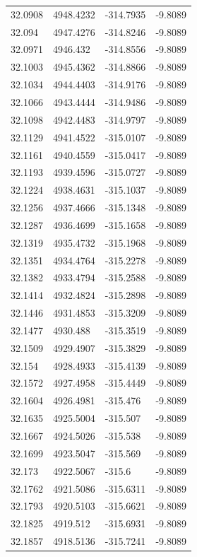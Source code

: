\begin{table}[H]
\begin{tabular}{llll}
32.0908 & 4948.4232 & -314.7935 & -9.8089 \\
32.094 & 4947.4276 & -314.8246 & -9.8089 \\
32.0971 & 4946.432 & -314.8556 & -9.8089 \\
32.1003 & 4945.4362 & -314.8866 & -9.8089 \\
32.1034 & 4944.4403 & -314.9176 & -9.8089 \\
32.1066 & 4943.4444 & -314.9486 & -9.8089 \\
32.1098 & 4942.4483 & -314.9797 & -9.8089 \\
32.1129 & 4941.4522 & -315.0107 & -9.8089 \\
32.1161 & 4940.4559 & -315.0417 & -9.8089 \\
32.1193 & 4939.4596 & -315.0727 & -9.8089 \\
32.1224 & 4938.4631 & -315.1037 & -9.8089 \\
32.1256 & 4937.4666 & -315.1348 & -9.8089 \\
32.1287 & 4936.4699 & -315.1658 & -9.8089 \\
32.1319 & 4935.4732 & -315.1968 & -9.8089 \\
32.1351 & 4934.4764 & -315.2278 & -9.8089 \\
32.1382 & 4933.4794 & -315.2588 & -9.8089 \\
32.1414 & 4932.4824 & -315.2898 & -9.8089 \\
32.1446 & 4931.4853 & -315.3209 & -9.8089 \\
32.1477 & 4930.488 & -315.3519 & -9.8089 \\
32.1509 & 4929.4907 & -315.3829 & -9.8089 \\
32.154 & 4928.4933 & -315.4139 & -9.8089 \\
32.1572 & 4927.4958 & -315.4449 & -9.8089 \\
32.1604 & 4926.4981 & -315.476 & -9.8089 \\
32.1635 & 4925.5004 & -315.507 & -9.8089 \\
32.1667 & 4924.5026 & -315.538 & -9.8089 \\
32.1699 & 4923.5047 & -315.569 & -9.8089 \\
32.173 & 4922.5067 & -315.6 & -9.8089 \\
32.1762 & 4921.5086 & -315.6311 & -9.8089 \\
32.1793 & 4920.5103 & -315.6621 & -9.8089 \\
32.1825 & 4919.512 & -315.6931 & -9.8089 \\
32.1857 & 4918.5136 & -315.7241 & -9.8089 \\

\end{tabular}
\end{table}
